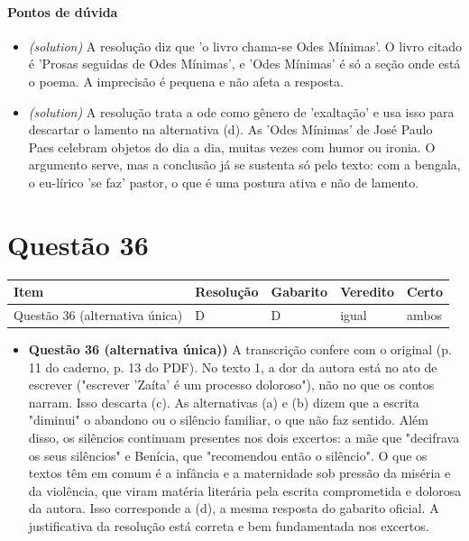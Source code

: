 \documentclass{article}%
\begin{document}
\paragraph{Pontos de dúvida}%
\begin{itemize}%
\item%
\textit{(solution)} A resolução diz que 'o livro chama{-}se Odes Mínimas'. O livro citado é 'Prosas seguidas de Odes Mínimas', e 'Odes Mínimas' é só a seção onde está o poema. A imprecisão é pequena e não afeta a resposta.%
\item%
\textit{(solution)} A resolução trata a ode como gênero de 'exaltação' e usa isso para descartar o lamento na alternativa (d). As 'Odes Mínimas' de José Paulo Paes celebram objetos do dia a dia, muitas vezes com humor ou ironia. O argumento serve, mas a conclusão já se sustenta só pelo texto: com a bengala, o eu{-}lírico 'se faz' pastor, o que é uma postura ativa e não de lamento.%
\end{itemize}%
\section*{Questão 36}%
\begin{longtable}{@{}p{} p{} p{} p{} p{}@{}}\toprule Item & Resolução & Gabarito & Veredito & Certo \\ \midrule
Questão 36 (alternativa única) & D & D & igual & ambos \\
\bottomrule\end{longtable}%
\begin{itemize}%
\item%
\textbf{Questão 36 (alternativa única))} A transcrição confere com o original (p. 11 do caderno, p. 13 do PDF). No texto 1, a dor da autora está no ato de escrever ("escrever 'Zaíta' é um processo doloroso"), não no que os contos narram. Isso descarta (c). As alternativas (a) e (b) dizem que a escrita "diminui" o abandono ou o silêncio familiar, o que não faz sentido. Além disso, os silêncios continuam presentes nos dois excertos: a mãe que "decifrava os seus silêncios" e Benícia, que "recomendou então o silêncio". O que os textos têm em comum é a infância e a maternidade sob pressão da miséria e da violência, que viram matéria literária pela escrita comprometida e dolorosa da autora. Isso corresponde a (d), a mesma resposta do gabarito oficial. A justificativa da resolução está correta e bem fundamentada nos excertos.%
\end{itemize}%
\end{document}
